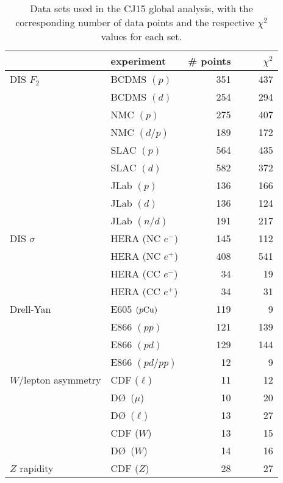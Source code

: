 \documentclass[aps,prd,amsmath,preprint]{revtex4}
\begin{document}
\begin{table}[tb]
\caption{Data sets used in the CJ15 global analysis, with the
	corresponding number of data points and the respective
	$\chi^2$ values for each set.\\}
\centering
{\scriptsize  
\begin{tabular}[c]{llrr}  \hline
  & experiment       			& \# points\!\!\!\!
					&\ \ \ \ $\chi^2$ \\ \hline
DIS $F_2$
  & BCDMS $(p)$ 	\cite{BCDMS}    & 351 & 437 \\
  & BCDMS $(d)$ 	\cite{BCDMS}    & 254 & 294 \\
  & NMC   $(p)$   	\cite{NMCp}     & 275 & 407 \\
  & NMC   $(d/p)$ 	\cite{NMCdop}   & 189 & 172 \\
  & SLAC  $(p)$  	\cite{SLAC}     & 564 & 435 \\
  & SLAC  $(d)$  	\cite{SLAC}     & 582 & 372 \\
  & JLab  $(p)$  	\cite{Malace}   & 136 & 166 \\
  & JLab  $(d)$  	\cite{Malace}   & 136 & 124 \\
  & JLab  $(n/d)$	\cite{BONuS}  	& 191 & 217 \\
DIS $\sigma$
  & HERA (NC $e^-$) 	\cite{HERA1}    & 145 & 112 \\
  & HERA (NC $e^+$) 	\cite{HERA1}    & 408 & 541 \\
  & HERA (CC $e^-$) 	\cite{HERA1}    &  34 &  19 \\
  & HERA (CC $e^+$) 	\cite{HERA1}    &  34 &  31 \\
Drell-Yan
  & E605 $(p{\rm Cu})$	\cite{E605}     & 119 &   9 \\
  & E866 $(pp)$		\cite{E866}     & 121 & 139 \\
  & E866 $(pd)$ 	\cite{E866}     & 129 & 144 \\
  & E866 $(pd/pp)$ 	\cite{E866rat}  &  12 &   9 \\
$W$/lepton asymmetry
  & CDF  ($\ell$)	\cite{CDF_l}    &  11 &  12 \\
  & D\O\ ($\mu$)  	\cite{D0_mu}    &  10 &  20 \\  
  & D\O\ ($\ell$) 	\cite{D0_l}     &  13 &  27 \\
  & CDF  ($W$)    	\cite{CDF_W}    &  13 &  15 \\
  & D\O\ ($W$)    	\cite{D0_W}     &  14 &  16 \\
$Z$ rapidity
  & CDF  ($Z$)		\cite{CDFZ}     &  28 &  27 \\ 

\end{tabular}}
\end{table}
\end{document}
